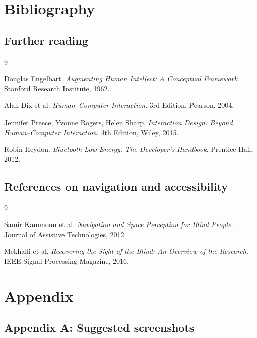 \documentclass[12pt,a4paper]{article}
\begin{document}
\newpage
\section{Bibliography}

\subsection{Further reading}

\begin{thebibliography}{9}

Douglas Engelbart.  
\textit{Augmenting Human Intellect: A Conceptual Framework}.  
Stanford Research Institute, 1962.

Alan Dix et al.  
\textit{Human–Computer Interaction}.  
3rd Edition, Pearson, 2004.

Jennifer Preece, Yvonne Rogers, Helen Sharp.  
\textit{Interaction Design: Beyond Human–Computer Interaction}.  
4th Edition, Wiley, 2015.

Robin Heydon.  
\textit{Bluetooth Low Energy: The Developer’s Handbook}.  
Prentice Hall, 2012.

\end{thebibliography}

\subsection{References on navigation and accessibility}

\begin{thebibliography}{9}

Samir Kammoun et al.  
\textit{Navigation and Space Perception for Blind People}.  
Journal of Assistive Technologies, 2012.

Mekhalfi et al.  
\textit{Recovering the Sight of the Blind: An Overview of the Research}.  
IEEE Signal Processing Magazine, 2016.

\end{thebibliography}

\newpage
\section{Appendix}

\subsection{Appendix A: Suggested screenshots}
\end{document}

